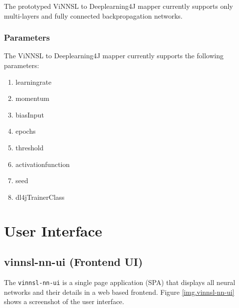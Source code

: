 The prototyped ViNNSL to Deeplearning4J mapper currently supports only
multi-layers and fully connected backpropagation networks.

\subsection{Parameters}\label{parameters}

The ViNNSL to Deeplearning4J mapper currently supports the following
parameters:

\begin{enumerate}
\def\labelenumi{\arabic{enumi}.}
\tightlist
\item
  learningrate
\item
  momentum
\item
  biasInput
\item
  epochs
\item
  threshold
\item
  activationfunction
\item
  seed
\item
  dl4jTrainerClass
\end{enumerate}

\chapter{User Interface}\label{user-interface-2}

\section{vinnsl-nn-ui (Frontend UI)}\label{vinnsl-nn-ui-frontend-ui-1}

The \texttt{vinnsl-nn-ui} is a single page application (SPA) that
displays all neural networks and their details in a web based frontend.
Figure \ref{img.vinnsl-nn-ui} shows a screenshot of the user interface.


